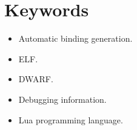 \documentclass[a4paper,
	fontsize=12pt,
	titlepage=firstiscover,
	chapterprefix=true,
	appendixprefix=true,
	headings=big,
	headsepline,
	toc=bibliographynumbered,
	twoside]{scrbook}
\begin{document}
\cleardoublepage


\cleardoublepage
\chapter*{Keywords}
\begin{itemize}
	\item Automatic binding generation.
	\item \gls{ELF}.
	\item \gls{DWARF}.
	\item Debugging information.
	\item Lua programming language.
\end{itemize}

\cleardoublepage
\tableofcontents
\listoffigures
\listoftables

\mainmatter
\pagestyle{scrheadings}






\backmatter
\cleardoublepage
\printglossaries
\end{document}
